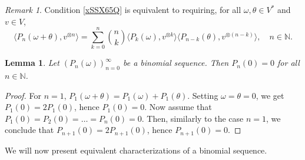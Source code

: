 \documentclass[12pt]{article}
\newtheorem{lemma}[theorem]{Lemma}
\theoremstyle{remark}
\theoremstyle{remark}
\theoremstyle{remark}
\newtheorem{remark}[theorem]{Remark}
\begin{document}
\begin{remark}Condition \eqref{xSSX65Q} is equivalent to requiring, for all $\omega,\theta\in V^*$ and  $v\in V$,  
\begin{equation*}\langle P_n(\omega+\theta),v^{\otimes n}\rangle=\sum_{k=0}^n{{n}\choose{k}}\langle 
P_k(\omega),v^{\otimes k}\rangle\langle P_{n-k}(\theta),v^{\otimes(n-k)}\rangle,\quad n\in\mathbb N.
\end{equation*}
\end{remark}

\begin{lemma}
\label{gfyrdr6ew64ui}
Let $(P_n(\omega))_{n=0}^\infty$ be a binomial sequence. Then $P_n(0)=0$ for all $n\in\mathbb N$.
\end{lemma}

\begin{proof}
For $n=1$, $P_1(\omega+\theta)=P_1(\omega)+P_1(\theta)$.  Setting $\omega=\theta=0$, we get
$P_1(0)=2P_1(0)$, hence $P_1(0)=0$. Now assume that $P_1(0)=P_2(0)=\dots=P_n(0)=0$. Then, similarly to the case $n=1$, we conclude that $P_{n+1}(0)=2P_{n+1}(0)$, hence $P_{n+1}(0)=0$. 
\end{proof} 

We will now present equivalent characterizations of a binomial sequence.
\end{document}
